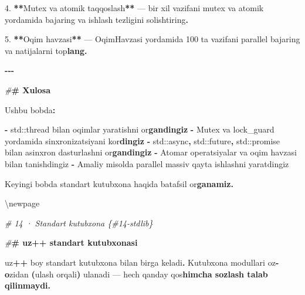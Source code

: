 \documentclass[a4paper,11pt,twoside,openright]{book}
\newenvironment{Shaded}{\begin{snugshade}}{\end{snugshade}}
\newcommand{\BuiltInTok}[1]{#1}
\newcommand{\CharTok}[1]{\textcolor[rgb]{0.31,0.60,0.02}{#1}}
\newcommand{\DecValTok}[1]{\textcolor[rgb]{0.00,0.00,0.81}{#1}}
\newcommand{\ErrorTok}[1]{\textcolor[rgb]{0.64,0.00,0.00}{\textbf{#1}}}
\newcommand{\FloatTok}[1]{\textcolor[rgb]{0.00,0.00,0.81}{#1}}
\newcommand{\NormalTok}[1]{#1}
\newcommand{\OperatorTok}[1]{\textcolor[rgb]{0.81,0.36,0.00}{\textbf{#1}}}
\newcommand{\PreprocessorTok}[1]{\textcolor[rgb]{0.56,0.35,0.01}{\textit{#1}}}
\begin{document}
\begin{Shaded}
\begin{Highlighting}[]
\FloatTok{4.} \OperatorTok{**}\NormalTok{Mutex va atomik taqqoslash}\OperatorTok{**}\NormalTok{ — bir xil vazifani mutex va atomik yordamida bajaring va ishlash tezligini solishtiring}\OperatorTok{.}

\FloatTok{5.} \OperatorTok{**}\NormalTok{Oqim havzasi}\OperatorTok{**}\NormalTok{ — }\ErrorTok{\textasciigrave{}}\NormalTok{OqimHavzasi}\ErrorTok{\textasciigrave{}}\NormalTok{ yordamida }\DecValTok{100}\NormalTok{ ta vazifani parallel bajaring va natijalarni to}\CharTok{\textquotesingle{}p}\ErrorTok{lang.}

\OperatorTok{{-}{-}{-}}

\PreprocessorTok{\#}\ErrorTok{\# Xulosa}

\NormalTok{Ushbu bobda}\OperatorTok{:}

\OperatorTok{{-}} \ErrorTok{\textasciigrave{}}\BuiltInTok{std::}\NormalTok{thread}\ErrorTok{\textasciigrave{}}\NormalTok{ bilan oqimlar yaratishni o}\CharTok{\textquotesingle{}r}\ErrorTok{gandingiz}
\OperatorTok{{-}}\NormalTok{ Mutex va lock\_guard yordamida sinxronizatsiyani ko}\CharTok{\textquotesingle{}r}\ErrorTok{dingiz}
\OperatorTok{{-}} \ErrorTok{\textasciigrave{}}\BuiltInTok{std::}\NormalTok{async}\ErrorTok{\textasciigrave{}}\OperatorTok{,} \ErrorTok{\textasciigrave{}}\BuiltInTok{std::}\NormalTok{future}\ErrorTok{\textasciigrave{}}\OperatorTok{,} \ErrorTok{\textasciigrave{}}\BuiltInTok{std::}\NormalTok{promise}\ErrorTok{\textasciigrave{}}\NormalTok{ bilan asinxron dasturlashni o}\CharTok{\textquotesingle{}r}\ErrorTok{gandingiz}
\OperatorTok{{-}}\NormalTok{ Atomar operatsiyalar va oqim havzasi bilan tanishdingiz}
\OperatorTok{{-}}\NormalTok{ Amaliy misolda parallel massiv qayta ishlashni yaratdingiz}

\NormalTok{Keyingi bobda standart kutubxona haqida batafsil o}\CharTok{\textquotesingle{}r}\ErrorTok{ganamiz.}


\NormalTok{\textbackslash{}newpage}

\PreprocessorTok{\# 14 · Standart kutubxona \{\#14{-}stdlib\}}

\PreprocessorTok{\#}\ErrorTok{\# uz++ standart kutubxonasi}

\NormalTok{uz}\OperatorTok{++}\NormalTok{ boy standart kutubxona bilan birga keladi}\OperatorTok{.}\NormalTok{ Kutubxona modullari o}\CharTok{\textquotesingle{}z}\ErrorTok{{-}o}\CharTok{\textquotesingle{}}\NormalTok{zidan }\OperatorTok{(}\ErrorTok{\textasciigrave{}}\NormalTok{ulash}\ErrorTok{\textasciigrave{}}\NormalTok{ orqali}\OperatorTok{)}\NormalTok{ ulanadi — hech qanday qo}\CharTok{\textquotesingle{}s}\ErrorTok{himcha sozlash talab qilinmaydi.}


\end{Highlighting}
\end{Shaded}
\end{document}

